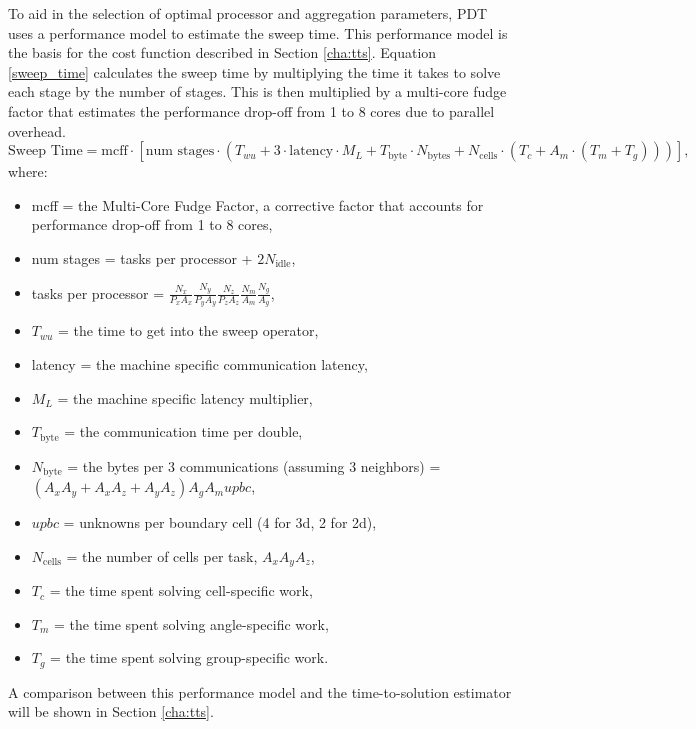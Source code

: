 \documentclass[times,final]{elsarticle}
\begin{document}
To aid in the selection of optimal processor and aggregation parameters, PDT uses a performance model to estimate the sweep time.
This performance model is the basis for the cost function described in Section \ref{cha:tts}.
Equation \ref{sweep_time} calculates the sweep time by multiplying the time it takes to solve each stage by the number of stages.
This is then multiplied by a multi-core fudge factor that estimates the performance drop-off from 1 to 8 cores due to parallel overhead.
\begin{equation}
\text{Sweep Time} = \text{mcff}\cdot[\text{num stages}\cdot(T_{wu} + 3\cdot \text{latency}\cdot M_L + T_{\text{byte}}\cdot N_{\text{bytes}} + N_{\text{cells}}\cdot ( T_c +  A_m\cdot (T_m + T_g)))],
\label{sweep_time}
\end{equation}
where:
\begin{itemize}
  \item mcff = the Multi-Core Fudge Factor, a corrective factor that accounts for performance drop-off from 1 to 8 cores,
  \item num stages = tasks per processor + $2N_{\text{idle}}$,
  \item tasks per processor = $\frac{N_x}{P_x A_x} \frac{N_y}{P_y A_y} \frac{N_z}{P_z A_z} \frac{N_m}{A_m} \frac{N_g}{A_g}$,
  \item $T_{wu}$ = the time to get into the sweep operator,
  \item latency = the machine specific communication latency,
  \item $M_L$ = the machine specific latency multiplier,
  \item $T_{\text{byte}}$ = the communication time per double,
  \item $N_{\text{byte}}$ = the bytes per 3 communications (assuming 3 neighbors) = $(A_x A_y + A_x A_z + A_y A_z)A_g A_m upbc $,
  \item $upbc$ = unknowns per boundary cell (4 for 3d, 2 for 2d),
  \item $N_{\text{cells}}$ = the number of cells per task, $A_x A_y A_z$,
  \item $T_c$ = the time spent solving cell-specific work,
  \item $T_m$ = the time spent solving angle-specific work,
  \item $T_g$ = the time spent solving group-specific work.
\end{itemize}
A comparison between this performance model and the time-to-solution estimator will be shown in Section \ref{cha:tts}. 
\end{document}
